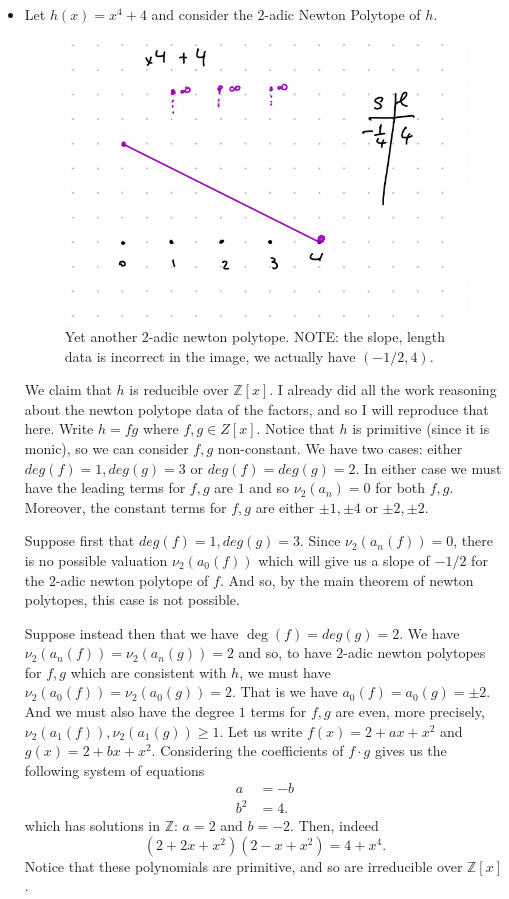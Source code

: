 \documentclass[12pt,letterpaper,boxed]{hmcpset}
\newcommand{\Z}{\mathbb Z}
\begin{document}
\begin{solution}
\begin{itemize}
\item Let $h(x) = x^4 + 4$ and consider the $2$-adic Newton Polytope
of $h$.
\begin{figure}[h]
	\centering
	\includegraphics[scale=0.5]{newt_d.png}	
	\caption{Yet another $2$-adic newton polytope.
	NOTE: the slope, length data is incorrect in the image, we
	actually have $(-1/2, 4)$.
	}
\end{figure}
We claim that $h$ is reducible over $\Z[x]$. 
I already did all the work reasoning about the newton polytope data of
the factors, and so I will reproduce that here.
Write $h = fg$ where $f,g
\in Z[x]$. Notice that $h$ is primitive (since it is monic), so we can consider $f,g$
non-constant. We have two cases: either $deg(f) = 1, deg(g) = 3$ or
$deg(f) = deg(g) = 2$. In either case we must have the leading terms
for $f,g$ are $1$ and so $\nu_2(a_n) = 0$ for both $f,g$. 
Moreover, the constant terms for $f,g$ are either $\pm 1,
\pm 4$ or $\pm 2, \pm 2$.

Suppose first that $deg(f) = 1, deg(g) = 3$. 
Since $\nu_2(a_n(f)) = 0$, there is no possible
valuation $\nu_2(a_0(f))$ which will give us a slope of $-1/2$ for the
$2$-adic newton polytope of $f$. And so, by the main theorem of newton
polytopes, this case is not possible.

Suppose instead then that we have $\deg(f) = deg(g) = 2$. We have
$\nu_2(a_n(f)) = \nu_2(a_n(g)) = 2$ and so, to have $2$-adic newton
polytopes for $f,g$ which are consistent with $h$, we must have
$\nu_2(a_0(f)) = \nu_2(a_0(g)) = 2$. That is we have $a_0(f) = a_0(g)
= \pm 2$. And we must also have the degree $1$ terms for $f,g$ are
even, more precisely, $\nu_2(a_1(f)), \nu_2(a_1(g)) \geq 1$. 
Let us write $f(x) = 2 + ax + x^2$ and $g(x) = 2 + bx + x^2$.
Considering the coefficients of $f\cdot g$ gives us the following
system of equations 
\begin{align*}
	a &= -b \\
	b^2 &= 4.
\end{align*}
which has solutions in $\Z$: $a = 2$ and $b = -2$. Then, indeed \[
	(2 + 2x + x^2)(2 - x + x^2) = 4 + x^4.
\]
	Notice that these polynomials are primitive, and so are
	irreducible over $\Z[x]$.


\end{itemize}
\end{solution}
\end{document}
